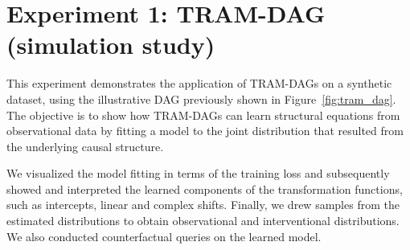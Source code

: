 % 
% 

% 
% 


% 






\section{Experiment 1: TRAM-DAG (simulation study)} \label{sec:methods_experiment1}

This experiment demonstrates the application of TRAM-DAGs on a synthetic dataset, using the illustrative DAG previously shown in Figure~\ref{fig:tram_dag}. The objective is to show how TRAM-DAGs can learn structural equations from observational data by fitting a model to the joint distribution that resulted from the underlying causal structure.

We visualized the model fitting in terms of the training loss and subsequently showed and interpreted the learned components of the transformation functions, such as intercepts, linear and complex shifts. Finally, we drew samples from the estimated distributions to obtain observational and interventional distributions. We also conducted counterfactual queries on the learned model.


